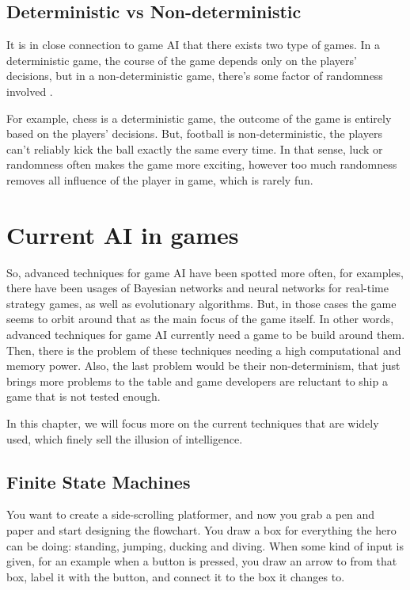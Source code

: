 \documentclass[a4paper, 12pt]{book}
\begin{document}
\section{Deterministic vs Non-deterministic}
It is in close connection to game AI that there exists two type of games. In a deterministic game, the course of the game depends only on the players’ decisions, but in a non-deterministic game, there’s some factor of randomness involved \cite{DeepLearningGO}. %

For example, chess is a deterministic game, the outcome of the game is entirely based on the players' decisions. But, football is non-deterministic, the players can't reliably kick the ball exactly the same every time. In that sense, luck or randomness often makes the game more exciting, however too much randomness removes all influence of the player in game, which is rarely fun.


\chapter{Current AI in games}
\label{ch2}

So, advanced techniques for game AI have been spotted more often, for examples, there have been usages of Bayesian networks and neural networks for real-time strategy games, as well as evolutionary algorithms. But, in those cases the game seems to orbit around that as the main focus of the game itself. In other words, advanced techniques for game AI currently need a game to be build around them. Then, there is the problem of these techniques needing a high computational and memory power. Also, the last problem would be their non-determinism, that just brings more problems to the table and game developers are reluctant to ship a game that is not tested enough.

In this chapter, we will focus more on the current techniques that are widely used, which finely sell the illusion of intelligence.

\section{Finite State Machines}

You want to create a side-scrolling platformer, and now you grab a pen and paper and start designing the flowchart. You draw a box for everything the hero can be doing: standing, jumping, ducking and diving. When some kind of input is given, for an example when a button is pressed, you draw an arrow to from that box, label it with the button, and connect it to the box it changes to.
\end{document}
